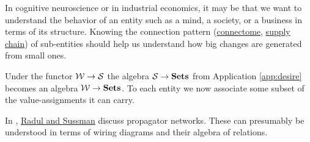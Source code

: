 \documentclass[CT4S-EN-RU]{subfiles}
\begin{document}
\begin{application}

In cognitive neuroscience or in industrial economics, it may be that we want to understand the behavior of an entity such as a mind, a society, or a business in terms of its structure. Knowing the connection pattern (\href{http://en.wikipedia.org/wiki/Connectome}{connectome}, \href{http://en.wikipedia.org/wiki/Supply_chain}{supply chain}) of sub-entities should help us understand how big changes are generated from small ones.

Under the functor $\mathcal{W}\rightarrow\mathcal{S}$ the algebra $\mathcal{S}\rightarrow{\bf Sets}$ from Application \ref{app:desire} becomes an algebra $\mathcal{W}\rightarrow{\bf Sets}$. To each entity we now associate some subset of the value-assignments it can carry. 
\end{application}

\begin{application}

In \cite{RS}, \href{http://dspace.mit.edu/bitstream/handle/1721.1/44215/MIT-CSAIL-TR-2009-002.pdf?sequence=1}{Radul and Sussman} discuss propagator networks. These can presumably be understood in terms of wiring diagrams and their algebra of relations.

\end{application}
 
\end{document}
